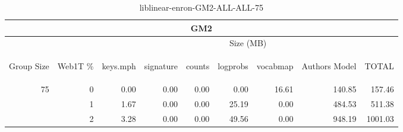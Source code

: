 \begin{center}
\begin{table}[htbp] 
 \begin{center}
\begin{tabular}{ | r | r | r | r | r | r | r | r | r |}
\hline
\multicolumn{9}{|c|}{GM2}\\
\hline
 & & \multicolumn{7}{|c|}{Size (MB)}\\ \cline{3-9}
\begin{sideways}Group Size\end{sideways} & \begin{sideways}Web1T \% \end{sideways} & \begin{sideways}keys.mph\end{sideways} & \begin{sideways}signature\end{sideways} & \begin{sideways}counts\end{sideways} & \begin{sideways}logprobs\end{sideways} & \begin{sideways}vocabmap\end{sideways} & \begin{sideways}Authors Model \end{sideways} & \begin{sideways}TOTAL\end{sideways}\\
\hline
\multirow{2}{*}{75}
 & 0 & 0.00 & 0.00 & 0.00 & 0.00 & 16.61 & 140.85 & 157.46\\ \cline{2-9}
 & 1 & 1.67 & 0.00 & 0.00 & 25.19 & 0.00 & 484.53 & 511.38\\ \cline{2-9}
 & 2 & 3.28 & 0.00 & 0.00 & 49.56 & 0.00 & 948.19 & 1001.03\\ \cline{2-9}
\hline
\end{tabular}
\caption{liblinear-enron-GM2-ALL-ALL-75}
\label{table:liblinear-enron-GM2-ALL-ALL-75}
\end{center}
 \end{table}
\end{center}

